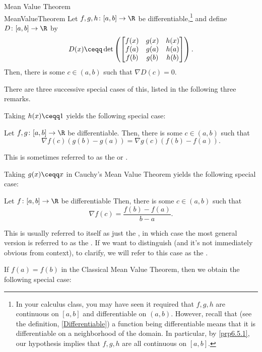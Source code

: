\begin{thm}{Mean Value Theorem \\}{MeanValueTheorem}
\noindent Let $f,g,h\colon [a,b]\rightarrow \R$ be differentiable,\footnote{In your calculus class, you may have seen it required that $f,g,h$ are continuous on $[a,b]$ and differentiable on $(a,b)$.  However, recall that (see the definition, \cref{Differentiable}) a function being differentiable means that it is differentiable on a neighborhood of the domain.  In particular, by \cref{prp6.5.1}, our hypothesis implies that $f,g,h$ are all continuous on $[a,b]$.} and define $D\colon [a,b]\rightarrow \R$ by
\begin{equation}
D(x)\ceqq \det \left( \begin{bmatrix}f(x) & g(x) & h(x) \\ f(a) & g(a) & h(a) \\ f(b) & g(b) & h(b)\end{bmatrix}\right) .
\end{equation}
Then, there is some $c\in (a,b)$ such that $\nabla D(c)=0$.
\begin{rmk}
There are three successive special cases of this, listed in the following three remarks.
\end{rmk}
\begin{rmk}
Taking $h(x)\ceqq 1$ yields the following special case:

Let $f,g\colon [a,b]\rightarrow \R$ be differentiable.  Then, there is some $c\in (a,b)$ such that
\begin{equation}\label{eqn6.4.16}
\nabla f(c)(g(b)-g(a))=\nabla g(c)(f(b)-f(a)).
\end{equation}

This is sometimes referred to as the  or .
\end{rmk}
\begin{rmk}
Taking $g(x)\ceqq x$ in Cauchy's Mean Value Theorem yields the following special case:

Let $f\colon [a,b]\rightarrow \R$ be differentiable  Then, there is some $c\in (a,b)$ such that
\begin{equation}\label{eqn6.4.17}
\nabla f(c)=\frac{f(b)-f(a)}{b-a}.
\end{equation}

This is usually referred to itself as just the , in which case the most general version is referred to as the .  If we want to distinguish (and it's not immediately obvious from context), to clarify, we will refer to this case as the .
\end{rmk}
\begin{rmk}
If $f(a)=f(b)$ in the Classical Mean Value Theorem, then we obtain the following special case:


\end{rmk}
\end{thm}
